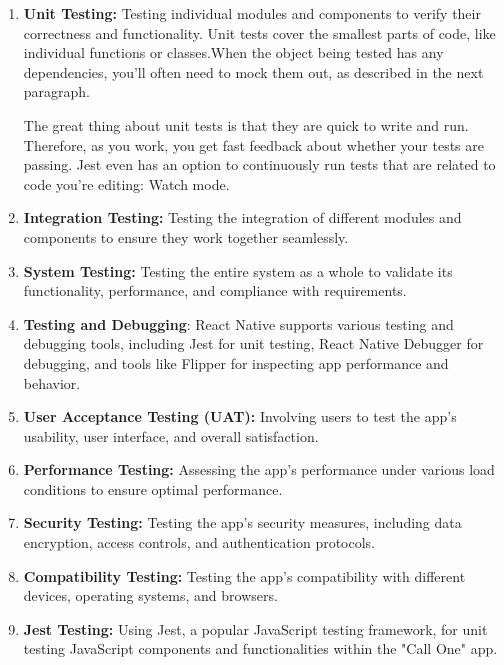 \begin{enumerate}
    \item \textbf{Unit Testing:} Testing individual modules and components to verify their correctness and functionality.
    Unit tests cover the smallest parts of code, like individual functions or classes.When the object being tested has any dependencies, you’ll often need to mock them out, as described in the next paragraph.
    
    The great thing about unit tests is that they are quick to write and run. Therefore, as you work, you get fast feedback about whether your tests are passing. Jest even has an option to continuously run tests that are related to code you’re editing: Watch mode.
    
    \item \textbf{Integration Testing:} Testing the integration of different modules and components to ensure they work together seamlessly.
    
    \item \textbf{System Testing:} Testing the entire system as a whole to validate its functionality, performance, and compliance with requirements.

    \item \textbf{Testing and Debugging}: React Native supports various testing and debugging tools, including Jest for unit testing, React Native Debugger for debugging, and tools like Flipper for inspecting app performance and behavior.
    
    
    \item \textbf{User Acceptance Testing (UAT):} Involving users to test the app's usability, user interface, and overall satisfaction.
    
    \item \textbf{Performance Testing:} Assessing the app's performance under various load conditions to ensure optimal performance.
    
    \item \textbf{Security Testing:} Testing the app's security measures, including data encryption, access controls, and authentication protocols.
    
    \item \textbf{Compatibility Testing:} Testing the app's compatibility with different devices, operating systems, and browsers.
    
    \item \textbf{Jest Testing:} Using Jest, a popular JavaScript testing framework, for unit testing JavaScript components and functionalities within the "Call One" app.
    

\end{enumerate}
